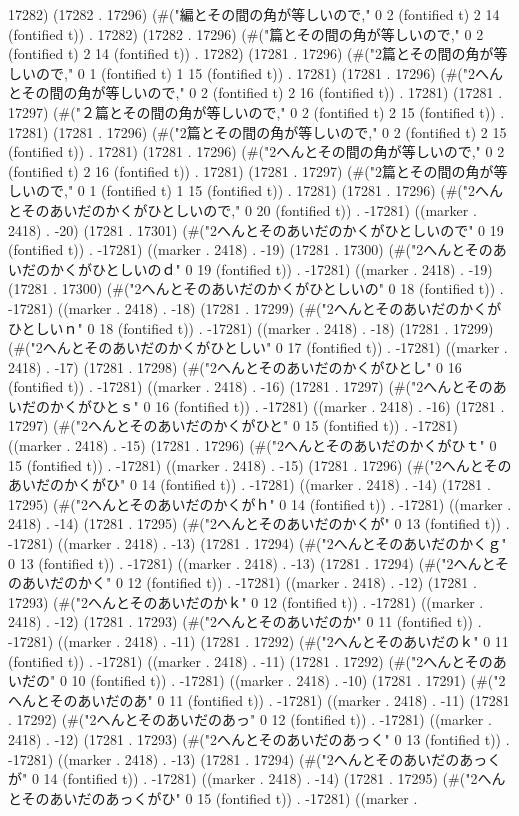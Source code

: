 17282) (17282 . 17296) (#("編とその間の角が等しいので," 0 2 (fontified t) 2 14 (fontified t)) . 17282) (17282 . 17296) (#("篇とその間の角が等しいので," 0 2 (fontified t) 2 14 (fontified t)) . 17282) (17281 . 17296) (#("2篇とその間の角が等しいので," 0 1 (fontified t) 1 15 (fontified t)) . 17281) (17281 . 17296) (#("2へんとその間の角が等しいので," 0 2 (fontified t) 2 16 (fontified t)) . 17281) (17281 . 17297) (#("２篇とその間の角が等しいので," 0 2 (fontified t) 2 15 (fontified t)) . 17281) (17281 . 17296) (#("2篇とその間の角が等しいので," 0 2 (fontified t) 2 15 (fontified t)) . 17281) (17281 . 17296) (#("2へんとその間の角が等しいので," 0 2 (fontified t) 2 16 (fontified t)) . 17281) (17281 . 17297) (#("2篇とその間の角が等しいので," 0 1 (fontified t) 1 15 (fontified t)) . 17281) (17281 . 17296) (#("2へんとそのあいだのかくがひとしいので," 0 20 (fontified t)) . -17281) ((marker . 2418) . -20) (17281 . 17301) (#("2へんとそのあいだのかくがひとしいので" 0 19 (fontified t)) . -17281) ((marker . 2418) . -19) (17281 . 17300) (#("2へんとそのあいだのかくがひとしいのｄ" 0 19 (fontified t)) . -17281) ((marker . 2418) . -19) (17281 . 17300) (#("2へんとそのあいだのかくがひとしいの" 0 18 (fontified t)) . -17281) ((marker . 2418) . -18) (17281 . 17299) (#("2へんとそのあいだのかくがひとしいｎ" 0 18 (fontified t)) . -17281) ((marker . 2418) . -18) (17281 . 17299) (#("2へんとそのあいだのかくがひとしい" 0 17 (fontified t)) . -17281) ((marker . 2418) . -17) (17281 . 17298) (#("2へんとそのあいだのかくがひとし" 0 16 (fontified t)) . -17281) ((marker . 2418) . -16) (17281 . 17297) (#("2へんとそのあいだのかくがひとｓ" 0 16 (fontified t)) . -17281) ((marker . 2418) . -16) (17281 . 17297) (#("2へんとそのあいだのかくがひと" 0 15 (fontified t)) . -17281) ((marker . 2418) . -15) (17281 . 17296) (#("2へんとそのあいだのかくがひｔ" 0 15 (fontified t)) . -17281) ((marker . 2418) . -15) (17281 . 17296) (#("2へんとそのあいだのかくがひ" 0 14 (fontified t)) . -17281) ((marker . 2418) . -14) (17281 . 17295) (#("2へんとそのあいだのかくがｈ" 0 14 (fontified t)) . -17281) ((marker . 2418) . -14) (17281 . 17295) (#("2へんとそのあいだのかくが" 0 13 (fontified t)) . -17281) ((marker . 2418) . -13) (17281 . 17294) (#("2へんとそのあいだのかくｇ" 0 13 (fontified t)) . -17281) ((marker . 2418) . -13) (17281 . 17294) (#("2へんとそのあいだのかく" 0 12 (fontified t)) . -17281) ((marker . 2418) . -12) (17281 . 17293) (#("2へんとそのあいだのかｋ" 0 12 (fontified t)) . -17281) ((marker . 2418) . -12) (17281 . 17293) (#("2へんとそのあいだのか" 0 11 (fontified t)) . -17281) ((marker . 2418) . -11) (17281 . 17292) (#("2へんとそのあいだのｋ" 0 11 (fontified t)) . -17281) ((marker . 2418) . -11) (17281 . 17292) (#("2へんとそのあいだの" 0 10 (fontified t)) . -17281) ((marker . 2418) . -10) (17281 . 17291) (#("2へんとそのあいだのあ" 0 11 (fontified t)) . -17281) ((marker . 2418) . -11) (17281 . 17292) (#("2へんとそのあいだのあっ" 0 12 (fontified t)) . -17281) ((marker . 2418) . -12) (17281 . 17293) (#("2へんとそのあいだのあっく" 0 13 (fontified t)) . -17281) ((marker . 2418) . -13) (17281 . 17294) (#("2へんとそのあいだのあっくが" 0 14 (fontified t)) . -17281) ((marker . 2418) . -14) (17281 . 17295) (#("2へんとそのあいだのあっくがひ" 0 15 (fontified t)) . -17281) ((marker . 